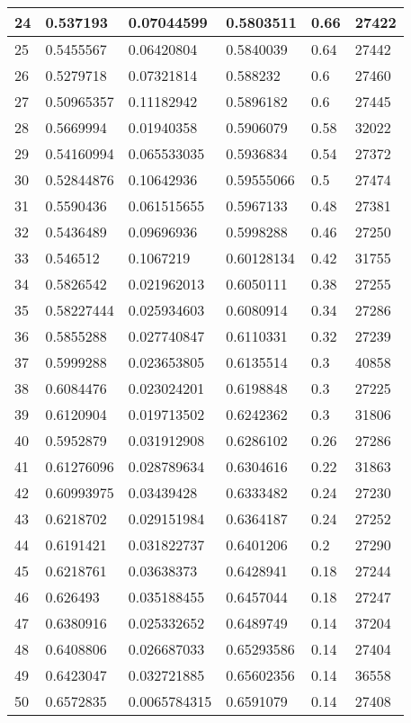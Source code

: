 \begin{longtable}{|l|l|l|l|l|l|}
24 & 0.537193 & 0.07044599 & 0.5803511 & 0.66 & 27422 \\ \hline 
25 & 0.5455567 & 0.06420804 & 0.5840039 & 0.64 & 27442 \\ \hline 
26 & 0.5279718 & 0.07321814 & 0.588232 & 0.6 & 27460 \\ \hline 
27 & 0.50965357 & 0.11182942 & 0.5896182 & 0.6 & 27445 \\ \hline 
28 & 0.5669994 & 0.01940358 & 0.5906079 & 0.58 & 32022 \\ \hline 
29 & 0.54160994 & 0.065533035 & 0.5936834 & 0.54 & 27372 \\ \hline 
30 & 0.52844876 & 0.10642936 & 0.59555066 & 0.5 & 27474 \\ \hline 
31 & 0.5590436 & 0.061515655 & 0.5967133 & 0.48 & 27381 \\ \hline 
32 & 0.5436489 & 0.09696936 & 0.5998288 & 0.46 & 27250 \\ \hline 
33 & 0.546512 & 0.1067219 & 0.60128134 & 0.42 & 31755 \\ \hline 
34 & 0.5826542 & 0.021962013 & 0.6050111 & 0.38 & 27255 \\ \hline 
35 & 0.58227444 & 0.025934603 & 0.6080914 & 0.34 & 27286 \\ \hline 
36 & 0.5855288 & 0.027740847 & 0.6110331 & 0.32 & 27239 \\ \hline 
37 & 0.5999288 & 0.023653805 & 0.6135514 & 0.3 & 40858 \\ \hline 
38 & 0.6084476 & 0.023024201 & 0.6198848 & 0.3 & 27225 \\ \hline 
39 & 0.6120904 & 0.019713502 & 0.6242362 & 0.3 & 31806 \\ \hline 
40 & 0.5952879 & 0.031912908 & 0.6286102 & 0.26 & 27286 \\ \hline 
41 & 0.61276096 & 0.028789634 & 0.6304616 & 0.22 & 31863 \\ \hline 
42 & 0.60993975 & 0.03439428 & 0.6333482 & 0.24 & 27230 \\ \hline 
43 & 0.6218702 & 0.029151984 & 0.6364187 & 0.24 & 27252 \\ \hline 
44 & 0.6191421 & 0.031822737 & 0.6401206 & 0.2 & 27290 \\ \hline 
45 & 0.6218761 & 0.03638373 & 0.6428941 & 0.18 & 27244 \\ \hline 
46 & 0.626493 & 0.035188455 & 0.6457044 & 0.18 & 27247 \\ \hline 
47 & 0.6380916 & 0.025332652 & 0.6489749 & 0.14 & 37204 \\ \hline 
48 & 0.6408806 & 0.026687033 & 0.65293586 & 0.14 & 27404 \\ \hline 
49 & 0.6423047 & 0.032721885 & 0.65602356 & 0.14 & 36558 \\ \hline 
50 & 0.6572835 & 0.0065784315 & 0.6591079 & 0.14 & 27408 \\ \hline 
\end{longtable}
